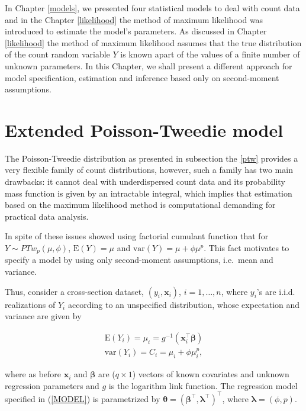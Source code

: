 \documentclass[9pt,a5paper,]{book}
\theoremstyle{definition}
\theoremstyle{definition}
\theoremstyle{remark}
\begin{document}
In Chapter \ref{models}, we presented four statistical models to deal
with count data and in the Chapter \ref{likelihood} the method of
maximum likelihood was introduced to estimate the model's parameters. As
discussed in Chapter \ref{likelihood} the method of maximum likelihood
assumes that the true distribution of the count random variable \(Y\) is
known apart of the values of a finite number of unknown parameters. In
this Chapter, we shall present a different approach for model
specification, estimation and inference based only on second-moment
assumptions.

\section{Extended Poisson-Tweedie
model}\label{extended-poisson-tweedie-model}

The Poisson-Tweedie distribution as presented in subsection the
\ref{ptw} provides a very flexible family of count distributions,
however, such a family has two main drawbacks: it cannot deal with
underdispersed count data and its probability mass function is given by
an intractable integral, which implies that estimation based on the
maximum likelihood method is computational demanding for practical data
analysis.

In spite of these issues \citep{Jorgensen2014} showed using factorial
cumulant function that for \(Y \sim PTw_p(\mu, \phi)\),
\(\mathrm{E}(Y) = \mu\) and \(\mathrm{var}(Y) = \mu + \phi \mu^p\). This
fact motivates \citep{Bonat2016b} to specify a model by using only
second-moment assumptions, i.e.~mean and variance.

Thus, consider a cross-section dataset, \((y_i, \boldsymbol{x}_i)\),
\(i = 1, \ldots, n\), where \(y_i\)'s are i.i.d. realizations of \(Y_i\)
according to an unspecified distribution, whose expectation and variance
are given by

\begin{align}
\mathrm{E}(Y_i) = \mu_i = g^{-1}(\boldsymbol{x}_i^{\top} \boldsymbol{\beta}) \\
\mathrm{var}(Y_i) = C_i = \mu_i + \phi \mu_i^p, 
\label{eq:EPTW}
\end{align}

where as before \(\boldsymbol{x}_i\) and \(\boldsymbol{\beta}\) are
(\(q \times 1\)) vectors of known covariates and unknown regression
parameters and \(g\) is the logarithm link function. The regression
model specified in (\ref{MODEL}) is parametrized by
\(\boldsymbol{\theta} = (\boldsymbol{\beta}^\top, \boldsymbol{\lambda}^\top )^\top\),
where \(\boldsymbol{\lambda} = (\phi, p)\).
\end{document}
